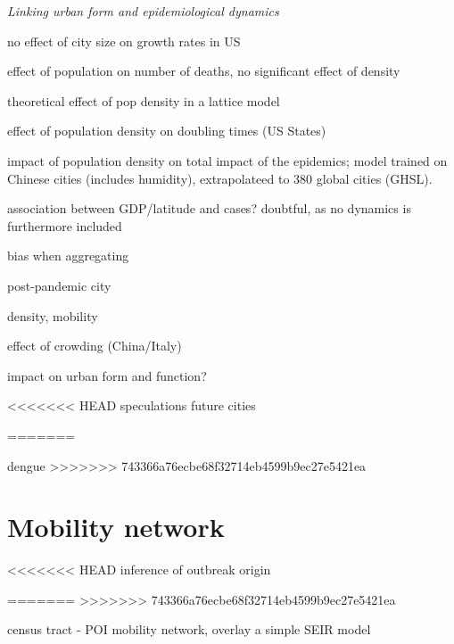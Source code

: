 \documentclass[10pt]{article}
\begin{document}
\textit{Linking urban form and epidemiological dynamics}


\cite{2020arXiv200401248H} no effect of city size on growth rates in US
	
\cite{angel2020coronavirus} effect of population on number of deaths, no significant effect of density

\cite{tarwater2001effects} theoretical effect of pop density in a lattice model	

\cite{White2020.04.14.20065318} effect of population density on doubling times (US States)
	
\cite{Rader2020.04.15.20064980} impact of population density on total impact of the epidemics; model trained on Chinese cities (includes humidity), extrapolateed to 380 global cities (GHSL).

\cite{2020arXiv200400110M} association between GDP/latitude and cases? doubtful, as no dynamics is furthermore included

\cite{2020arXiv200412994B} bias when aggregating

\cite{doi:10.1177/2399808320926912} post-pandemic city

\cite{bouffanais2020cities} density, mobility

	
\cite{rader2020crowding} effect of crowding (China/Italy)
	
\cite{batty2020social} impact on urban form and function?

\cite{huanglarge}

\cite{ivey2020land}

<<<<<<< HEAD
\cite{haken2021epilogue} speculations future cities

\cite{kustudic2021agent}

=======
\cite{paez2021reproducibility}

\cite{romeo2021fine} dengue
>>>>>>> 743366a76ecbe68f32714eb4599b9ec27e5421ea


	
\section{Mobility network}


<<<<<<< HEAD
\cite{schlosser2021finding} inference of outbreak origin

\cite{fan2021fine}
=======
\cite{ross2021household}
>>>>>>> 743366a76ecbe68f32714eb4599b9ec27e5421ea

\cite{kim2021impact}

\cite{chang2020mobility} census tract - POI mobility network, overlay a simple SEIR model
\end{document}
